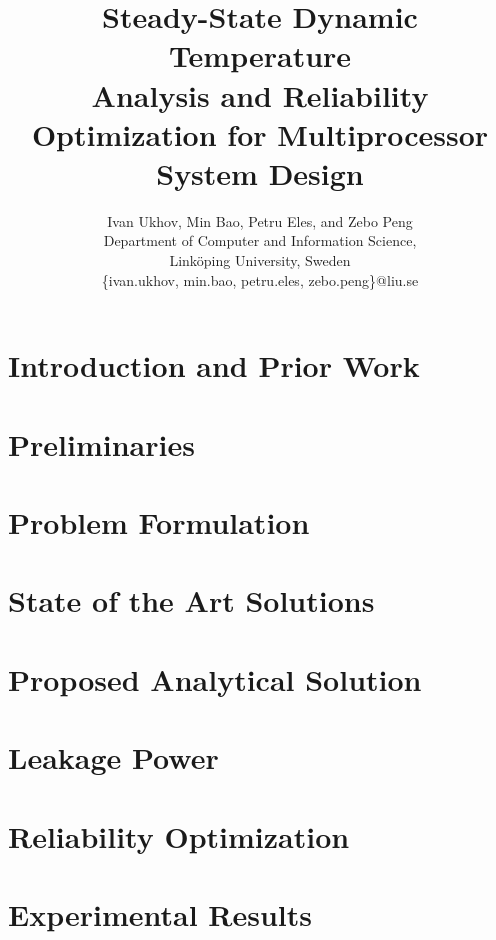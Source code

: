 \documentclass[conference]{IEEEtran}
\title{Steady-State Dynamic Temperature \\Analysis and Reliability Optimization for Multiprocessor System Design}
\author{
  Ivan Ukhov, Min Bao, Petru Eles, and Zebo Peng \\
  Department of Computer and Information Science,\\
  Link\"{o}ping University, Sweden \\
  \{ivan.ukhov, min.bao, petru.eles, zebo.peng\}@liu.se
}
\begin{document}
  \maketitle

  \begin{abstract}
    
  \end{abstract}

  \section{Introduction and Prior Work}
  

  \section{Preliminaries} \label{sec:preliminaries}
  

  \section{Problem Formulation} \label{sec:problem}
  

  \section{State of the Art Solutions} \label{sec:hotspot-solution}
  

  \section{Proposed Analytical Solution} \label{sec:analytical-solution}
  

  \section{Leakage Power} \label{sec:leakage}
  

  \section{Reliability Optimization} \label{sec:reliability}
  

  \section{Experimental Results} \label{sec:results}
  
\end{document}
